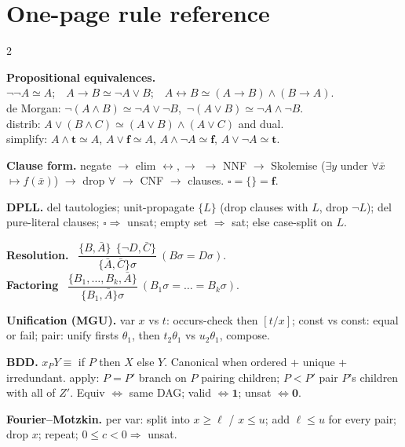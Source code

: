 \documentclass[11pt,a4paper]{article}
\newcommand{\imp}{\rightarrow}
\newcommand{\eq}{\simeq}
\newcommand{\T}{\mathbf{t}}
\newcommand{\F}{\mathbf{f}}
\begin{document}
\section*{One-page rule reference}
\begin{footnotesize}
\begin{multicols}{2}

\textbf{Propositional equivalences.}\\
$\neg\neg A\eq A$;\ \ $A\imp B\eq\neg A\vee B$;\ \ $A\leftrightarrow B\eq(A\imp B)\wedge(B\imp A)$.\\
de Morgan: $\neg(A\wedge B)\eq\neg A\vee\neg B$,\ $\neg(A\vee B)\eq\neg A\wedge\neg B$.\\
distrib: $A\vee(B\wedge C)\eq(A\vee B)\wedge(A\vee C)$ and dual.\\
simplify: $A\wedge\T\eq A$, $A\vee\F\eq A$, $A\wedge\neg A\eq\F$, $A\vee\neg A\eq\T$.

\textbf{Clause form.} negate $\to$ elim $\leftrightarrow,\imp$ $\to$ NNF $\to$ Skolemise ($\exists y$ under $\forall\bar x$ $\mapsto f(\bar x)$) $\to$ drop $\forall$ $\to$ CNF $\to$ clauses. $\square=\{\}=\F$.

\textbf{DPLL.} del tautologies; unit-propagate $\{L\}$ (drop clauses with $L$, drop $\neg L$); del pure-literal clauses; $\square\Rightarrow$ unsat; empty set $\Rightarrow$ sat; else case-split on $L$.

\textbf{Resolution.} \ $\dfrac{\{B,\bar A\}\ \ \{\neg D,\bar C\}}{\{\bar A,\bar C\}\sigma}\ (B\sigma{=}D\sigma)$.\\
\textbf{Factoring} \ $\dfrac{\{B_1,\dots,B_k,\bar A\}}{\{B_1,\bar A\}\sigma}\ (B_1\sigma{=}\dots{=}B_k\sigma)$.

\textbf{Unification (MGU).} var $x$ vs $t$: occurs-check then $[t/x]$; const vs const: equal or fail; pair: unify firsts $\theta_1$, then $t_2\theta_1$ vs $u_2\theta_1$, compose.

\textbf{BDD.} $x_P Y\equiv$ if $P$ then $X$ else $Y$. Canonical when ordered + unique + irredundant. apply: $P{=}P'$ branch on $P$ pairing children; $P{<}P'$ pair $P$'s children with all of $Z'$. Equiv $\Leftrightarrow$ same DAG; valid $\Leftrightarrow\mathbf1$; unsat $\Leftrightarrow\mathbf0$.

\textbf{Fourier--Motzkin.} per var: split into $x\ge\ell$ / $x\le u$; add $\ell\le u$ for every pair; drop $x$; repeat; $0\le c<0\Rightarrow$ unsat.

\columnbreak


\end{multicols}
\end{footnotesize}
\end{document}
